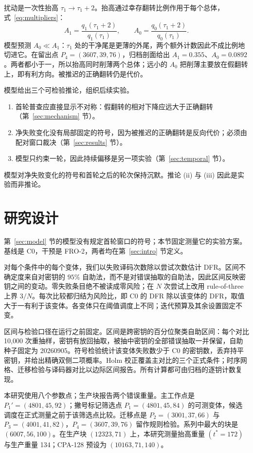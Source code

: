 \documentclass[UTF8,a4paper,10pt,twocolumn]{ctexart}
\begin{document}
扰动是一次性抬高 $\tau_1\to\tau_1+2$。抬高通过幸存翻转比例作用于每个总体，式~\eqref{eq:multipliers}：
\begin{equation}\label{eq:multipliers}
A_1=\frac{q_1(\tau_1+2)}{q_1(\tau_1)},\qquad
A_0=\frac{q_0(\tau_1+2)}{q_0(\tau_1)} .
\end{equation}
模型预测 $A_0\ll A_1$：$\tau_1$ 处的干净尾是更薄的外尾，两个额外计数因此不成比例地切进它。在留出点 $P_4=(3607,39,76)$，归档剖面给出 $A_1 = 0.355$、$A_0 = 0.0892$。两者都小于一，所以抬高同时削薄两个总体；远小的 $A_0$ 把削薄主要放在假翻转上，即有利方向。被推迟的正确翻转仍是代价。

模型给出三个可检验推论，组织后续实验。
\begin{enumerate}[label=(\roman*),leftmargin=*,itemsep=1pt,topsep=2pt]
\item 首轮普查应直接显示不对称：假翻转的相对下降应远大于正确翻转（第~\ref{sec:mechanism} 节）。
\item 净失败变化没有局部固定的符号，因为被推迟的正确翻转是反向代价；必须由配对窗口裁决（第~\ref{sec:results} 节）。
\item 模型只约束一轮，因此持续偏移是另一项实验（第~\ref{sec:temporal} 节）。
\end{enumerate}
模型对净失败变化的符号和首轮之后的轮次保持沉默。推论 (ii) 与 (iii) 因此是实验而非推论。
\section{研究设计}\label{sec:method}

第~\ref{sec:model} 节的模型没有规定首轮窗口的符号；本节固定测量它的实验方案。基线是 C0，干预是 FRO-2，两者均在第~\ref{sec:intro} 节定义。

对每个条件中的每个变体，我们以失败译码次数除以尝试次数估计 DFR。区间不确定度来自对密钥的 $95\%$ 自助法，而不是对错误抽取的自助法，因此区间反映密钥之间的变动。零失败条目绝不被读成零风险；在 $N$ 次尝试上改用 rule-of-three 上界 $3/N$。每次比较都归结为风险比，即 C0 的 DFR 除以该变体的 DFR，取值大于一有利于该变体。各变体只在阈值调度上不同；迭代预算及其余设置固定不变。

区间与检验口径在运行之前固定。区间是跨密钥的百分位聚类自助区间：每个对比 10{,}000 次重抽样，密钥有放回抽取，被抽中密钥的全部错误抽取一并保留，自助种子固定为 20260905。符号检验统计该变体失败数少于 C0 的密钥数，丢弃持平密钥，并给出精确双侧二项概率。Holm 校正覆盖主对比的三个正式条件；时序网格、迁移检验与译码器对比以边际区间报告。所有计算都可由归档的逐钥计数复现。

本研究使用八个参数点；生产块报告两个错误重量。主工作点是 $P_1'=(4801,45,92)$；撇号标记筛选点 $P_1=(4801,45,84)$ 的可测变体，候选调度在正式测量之前于该筛选点比较。迁移点是 $P_2=(3001,37,66)$ 与 $P_3=(4001,41,82)$，$P_4=(3607,39,76)$ 留作规则检验。系列中最大的块是 $(6007,56,100)$。在生产块 $(12323,71)$ 上，本研究测量抬高重量 $(t^{\ast}=172)$ 与生产重量 134；CPA-128 预设为 $(10163,71,140)$。
\end{document}
